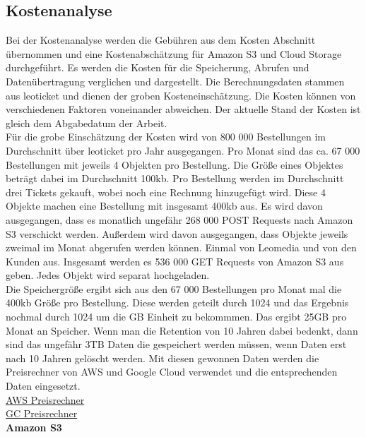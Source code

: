 \newpage

\subsection{Kostenanalyse}

Bei der Kostenanalyse werden die Gebühren aus dem Kosten Abschnitt übernommen und eine Kostenabschätzung für Amazon S3 und Cloud Storage durchgeführt. Es werden die Kosten für die Speicherung, Abrufen und Datenübertragung verglichen und dargestellt. Die Berechnungsdaten stammen aus leoticket und dienen der groben Kosteneinschätzung. Die Kosten können von verschiedenen Faktoren voneinander abweichen. Der aktuelle Stand der Kosten ist gleich dem Abgabedatum der Arbeit.\\

Für die grobe Einschätzung der Kosten wird von 800 000 Bestellungen im Durchschnitt über leoticket pro Jahr ausgegangen. Pro Monat sind das ca. 67 000 Bestellungen mit jeweils 4 Objekten pro Bestellung. Die Größe eines Objektes beträgt dabei im Durchschnitt 100kb. Pro Bestellung werden im Durchschnitt drei Tickets gekauft, wobei noch eine Rechnung hinzugefügt wird. Diese 4 Objekte machen eine Bestellung mit insgesamt 400kb aus. Es wird davon ausgegangen, dass es monatlich ungefähr 268 000 POST Requests nach Amazon S3 verschickt werden. Außerdem wird davon ausgegangen, dass Objekte jeweils zweimal im Monat abgerufen werden können. Einmal von Leomedia und von den Kunden aus. Insgesamt werden es 536 000 GET Requests von Amazon S3 aus geben. Jedes Objekt wird separat hochgeladen.\\

Die Speichergröße ergibt sich aus den 67 000 Bestellungen pro Monat mal die 400kb Größe pro Bestellung. Diese werden geteilt durch 1024 und das Ergebnis nochmal durch 1024 um die GB Einheit zu bekommmen. Das ergibt 25GB pro Monat an Speicher. Wenn man die Retention von 10 Jahren dabei bedenkt, dann sind das ungefähr 3TB Daten die gespeichert werden müssen, wenn Daten erst nach 10 Jahren gelöscht werden. Mit diesen gewonnen Daten werden die Preisrechner von AWS und Google Cloud verwendet und die entsprechenden Daten eingesetzt.\\

\href{https://calculator.aws/}{AWS Preisrechner}\\
\href{https://cloud.google.com/products/calculator}{GC Preisrechner}\\

\textbf{Amazon S3}\\

